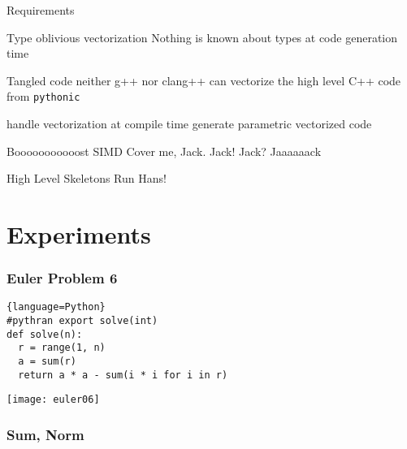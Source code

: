 \documentclass[serif]{beamer} %
\begin{document}
\begin{frame}{Requirements}
    \begin{block}{Type oblivious vectorization}
        Nothing is known about types at code generation time
    \end{block}
    \begin{block}{Tangled code}
        neither g++ nor clang++ can vectorize the high level C++ code from \texttt{pythonic}
    \end{block}
        \centering
        \structure{$\Rightarrow$} handle vectorization at compile time
        \newline
        \structure{$\Rightarrow$} generate parametric vectorized code

\end{frame}

\begin{frame}{Booooooooooost SIMD}
    Cover me, Jack. Jack! Jack? Jaaaaaack 
\end{frame}

\begin{frame}{High Level Skeletons}
    Run Hans!
\end{frame}

\section{Experiments}

\begin{frame}[fragile]
    \frametitle{Euler Problem 6}
    \centering
            \begin{lstlisting}{language=Python}
#pythran export solve(int)
def solve(n):
  r = range(1, n)
  a = sum(r)
  return a * a - sum(i * i for i in r)
            \end{lstlisting}

        \texttt{[image: euler06]}
\end{frame}

\begin{frame}[fragile]
    \frametitle{Sum, Norm}
    \centering
    \begin{columns}
     \end{columns}
\end{frame}
\end{document}
